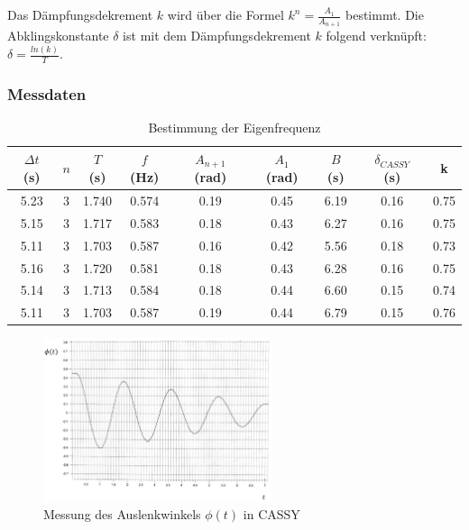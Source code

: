 \documentclass{article}
\begin{document}
Das Dämpfungsdekrement $k$ wird über die Formel $k^n = \frac{A_1}{A_{n+1}}$ bestimmt. Die Abklingskonstante $\delta$ ist
mit dem Dämpfungsdekrement $k$ folgend verknüpft: $\delta = \frac{ln(k)}{T}$.
\subsubsection{Messdaten}
\begin{table}[H]
    \centering
    \begin{tabular}{|c|c|c|c|c|c|c|c|c|}
    \hline
    $\Delta t$ (s) & $n$ & $T$ (s) & $f$ (Hz) & $A_{n+1}$ (rad) & $A_1$ (rad) & $B$ (s) & $\delta_{CASSY}$ (s) & k\\
    \hline
    5.23 & 3 & 1.740 & 0.574 & 0.19 & 0.45 & 6.19 & 0.16 & 0.75 \\
    5.15 & 3 & 1.717 & 0.583 & 0.18 & 0.43 & 6.27 & 0.16 & 0.75 \\
    5.11 & 3 & 1.703 & 0.587 & 0.16 & 0.42 & 5.56 & 0.18 & 0.73 \\
    5.16 & 3 & 1.720 & 0.581 & 0.18 & 0.43 & 6.28 & 0.16 & 0.75 \\
    5.14 & 3 & 1.713 & 0.584 & 0.18 & 0.44 & 6.60 & 0.15 & 0.74 \\
    5.11 & 3 & 1.703 & 0.587 & 0.19 & 0.44 & 6.79 & 0.15 & 0.76 \\
    \hline
    \end{tabular}
    \caption{Bestimmung der Eigenfrequenz}
    \label{tab:eigenfrequenz}
\end{table}

\begin{figure}[H]
    \centering
    \includegraphics[width=0.6\textwidth]{bilder/eigenfreq_messdaten.png}
    \caption{Messung des Auslenkwinkels $\phi(t)$ in CASSY}
    \label{fig:eigenfreq_messdaten}
\end{figure}
\end{document}
